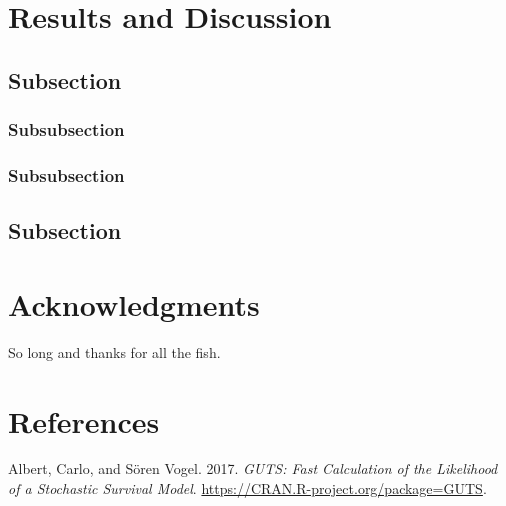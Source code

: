 \documentclass[fleqn,10pt,lineno]{wlpeerj} %
\begin{document}
\section*{Results and Discussion}\label{results-and-discussion}

\lipsum[10] 

\subsection*{Subsection}\label{subsection-2}

\lipsum[11] 

\subsubsection*{Subsubsection}\label{subsubsection}

\lipsum[12] 

\subsubsection*{Subsubsection}\label{subsubsection-1}

\lipsum[14] 

\subsection*{Subsection}\label{subsection-3}

\lipsum[15-20] 

\section*{Acknowledgments}\label{acknowledgments}

So long and thanks for all the fish.

\section*{References}\label{references}

\hypertarget{refs}{}
\hypertarget{ref-Albert2017GUTS}{}
Albert, Carlo, and Sören Vogel. 2017. \emph{GUTS: Fast Calculation of
the Likelihood of a Stochastic Survival Model}.
\url{https://CRAN.R-project.org/package=GUTS}.
\end{document}
